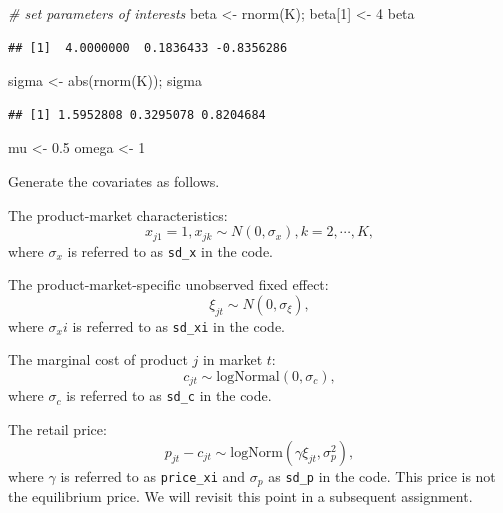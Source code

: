 \documentclass[
]{book}
\newenvironment{Shaded}{\begin{snugshade}}{\end{snugshade}}
\newcommand{\CommentTok}[1]{\textcolor[rgb]{0.56,0.35,0.01}{\textit{#1}}}
\newcommand{\DecValTok}[1]{\textcolor[rgb]{0.00,0.00,0.81}{#1}}
\newcommand{\FloatTok}[1]{\textcolor[rgb]{0.00,0.00,0.81}{#1}}
\newcommand{\FunctionTok}[1]{\textcolor[rgb]{0.00,0.00,0.00}{#1}}
\newcommand{\NormalTok}[1]{#1}
\newcommand{\OtherTok}[1]{\textcolor[rgb]{0.56,0.35,0.01}{#1}}
\begin{document}
\begin{Shaded}
\begin{Highlighting}[]
\CommentTok{\# set parameters of interests}
\NormalTok{beta }\OtherTok{\textless{}{-}} \FunctionTok{rnorm}\NormalTok{(K); }
\NormalTok{beta[}\DecValTok{1}\NormalTok{] }\OtherTok{\textless{}{-}} \DecValTok{4}
\NormalTok{beta}
\end{Highlighting}
\end{Shaded}

\begin{verbatim}
## [1]  4.0000000  0.1836433 -0.8356286
\end{verbatim}

\begin{Shaded}
\begin{Highlighting}[]
\NormalTok{sigma }\OtherTok{\textless{}{-}} \FunctionTok{abs}\NormalTok{(}\FunctionTok{rnorm}\NormalTok{(K)); sigma}
\end{Highlighting}
\end{Shaded}

\begin{verbatim}
## [1] 1.5952808 0.3295078 0.8204684
\end{verbatim}

\begin{Shaded}
\begin{Highlighting}[]
\NormalTok{mu }\OtherTok{\textless{}{-}} \FloatTok{0.5}
\NormalTok{omega }\OtherTok{\textless{}{-}} \DecValTok{1}
\end{Highlighting}
\end{Shaded}

Generate the covariates as follows.

The product-market characteristics:
\[
x_{j1} = 1, x_{jk} \sim N(0, \sigma_x), k = 2, \cdots, K,
\]
where \(\sigma_x\) is referred to as \texttt{sd\_x} in the code.

The product-market-specific unobserved fixed effect:
\[
\xi_{jt} \sim N(0, \sigma_\xi),
\]
where \(\sigma_xi\) is referred to as \texttt{sd\_xi} in the code.

The marginal cost of product \(j\) in market \(t\):
\[
c_{jt} \sim \text{logNormal}(0, \sigma_c),
\]
where \(\sigma_c\) is referred to as \texttt{sd\_c} in the code.

The retail price:
\[
p_{jt} - c_{jt} \sim \text{logNorm}(\gamma \xi_{jt}, \sigma_p^2),
\]
where \(\gamma\) is referred to as \texttt{price\_xi} and \(\sigma_p\) as \texttt{sd\_p} in the code. This price is not the equilibrium price. We will revisit this point in a subsequent assignment.
\end{document}
